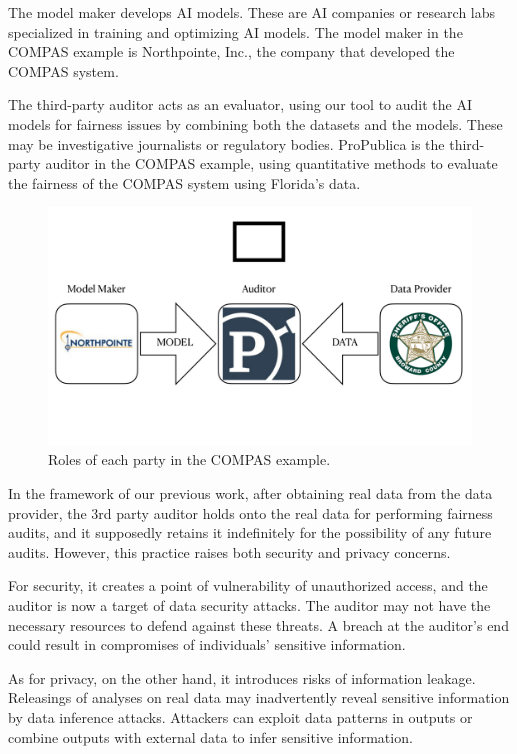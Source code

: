 \documentclass[manuscript,screen,review,anonymous]{acmart}
\begin{document}
The model maker develops AI models. These are AI companies or research labs specialized in training and optimizing AI models. The model maker in the COMPAS example is Northpointe, Inc., the company that developed the COMPAS system.

The third-party auditor acts as an evaluator, using our tool to audit the AI models for fairness issues by combining both the datasets and the models. These may be investigative journalists or regulatory bodies. ProPublica is the third-party auditor in the COMPAS example, using quantitative methods to evaluate the fairness of the COMPAS system using Florida's data.

\begin{figure}[h]
  \centering
  \includegraphics[width=\linewidth]{compas}
  \caption{Roles of each party in the COMPAS example.}
  \label{fig:compas}
\end{figure}


In the framework of our previous work\cite{yuan2024ensuring}, after obtaining real data from the data provider, the 3rd party auditor holds onto the real data for performing fairness audits, and it supposedly retains it indefinitely for the possibility of any future audits. However, this practice raises both security and privacy concerns.

For security, it creates a point of vulnerability of unauthorized access, and the auditor is now a target of data security attacks. The auditor may not have the necessary resources to defend against these threats. A breach at the auditor's end could result in compromises of individuals' sensitive information.

As for privacy, on the other hand, it introduces risks of information leakage. Releasings of analyses on real data may inadvertently reveal sensitive information by data inference attacks. Attackers can exploit data patterns in outputs or combine outputs with external data to infer sensitive information.
\end{document}
